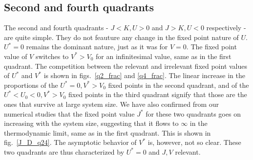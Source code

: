 \documentclass[12pt,twoside]{article}
\numberwithin{equation}{section}
\begin{document}
\subsection{Second and fourth quadrants}
The second and fourth quadrants - \( J<K, U>0 \) and \(J>K, U<0 \) respectively - are quite simple. They do not feauture any change in the fixed point nature of \(U\). \(U^*=0\)  remains the dominant nature, just as it was for \(V=0\). The fixed point value of \(V\) switches to \(V^*>V_0\) for an infinitesimal value, same as in the first quadrant. The competition between the relevant and irrelevant fixed point values of \(U^*\) and \(V^*\) is shown in figs.~\ref{q2_frac} and \ref{q4_frac}. The linear increase in the proportions of the \(U^*=0, V^*>V_0\) fixed points in the second quadrant, and of the \(U^* < U_0 < 0, V^*>V_0\) fixed points in the third quadrant signify that those are the ones that survive at large system size.
\pb We have also confirmed from our numerical studies that the fixed point value \(J^*\) for these two quadrants goes on increasing with the system size, suggesting that it flows to \(\infty\) in the thermodynamic limit, same as in the first quadrant. This is shown in fig.~\ref{J_D_q24}. The asymptotic behavior of \(V^*\) is, however, not so clear. These two quadrants are thus characterized by \(U^*=0\) and \(J,V\) relevant.
\end{document}
